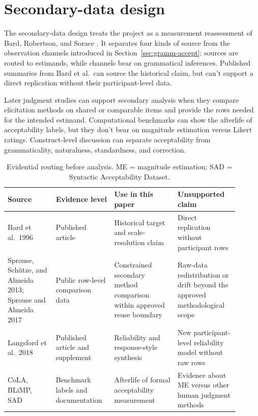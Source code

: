 \section{Secondary-data design}

The secondary-data design treats the project as a measurement reassessment of
Bard, Robertson, and Sorace \citep{BardEtAl1996}. It separates four kinds of
source from the observation channels introduced in
Section~\ref{sec:gramm-accept}: sources are routed to estimands, while channels
bear on grammatical inferences. Published summaries from Bard et al.\ can source
the historical claim, but can't support a direct replication without their
participant-level data.

Later judgment studies can support secondary analysis when they compare
elicitation methods on shared or comparable items and provide the rows needed
for the intended estimand. Computational benchmarks can show the afterlife of
acceptability labels, but they don't bear on magnitude estimation versus
Likert ratings. Construct-level discussion can separate acceptability from
grammaticality, naturalness, standardness, and correction.

\begin{table}[H]
\centering
\small
\begin{tabular}{@{}>{\raggedright\arraybackslash}p{0.19\linewidth}>{\raggedright\arraybackslash}p{0.22\linewidth}>{\raggedright\arraybackslash}p{0.25\linewidth}>{\raggedright\arraybackslash}p{0.24\linewidth}@{}}
\toprule
Source & Evidence level & Use in this paper & Unsupported claim \\
\midrule
Bard et al.\ 1996 & Published article & Historical target and scale-resolution claim & Direct replication without participant rows \\
Sprouse, Sch\"utze, and Almeida 2013; Sprouse and Almeida 2017 & Public row-level comparison data & Constrained secondary method comparison within approved reuse boundary & Raw-data redistribution or drift beyond the approved methodological scope \\
Langsford et al.\ 2018 & Published article and supplement & Reliability and response-style synthesis & New participant-level reliability model without raw rows \\
CoLA, BLiMP, SAD & Benchmark labels and documentation & Afterlife of formal acceptability measurement & Evidence about ME versus other human judgment methods \\
\bottomrule
\end{tabular}
\caption{Evidential routing before analysis. ME = magnitude estimation; SAD =
Syntactic Acceptability Dataset.}
\label{tab:evidence-routing}
\end{table}

